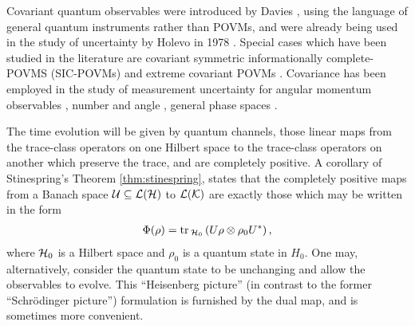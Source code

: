 Covariant quantum observables were introduced by Davies \cite{DAVIES1970318}, using the language of general quantum instruments rather than POVMs, and were already being used in the study of uncertainty by Holevo in 1978 \cite{HOLEVO1979385}. Special cases which have been studied in the literature are covariant symmetric informationally complete-POVMS (SIC-POVMs) \cites{doi:10.1063/1.1896384}{doi:10.1063/1.1737053} and extreme covariant POVMs \cites{doi:10.1063/1.2940328}{doi:10.1063/1.3668317}{doi:10.1063/1.1806262}{erkka-thesis}. Covariance has been employed in the study of measurement uncertainty for angular momentum observables \cite{DammeierSchwonnekWerner2015}, number and angle \cite{sharp-ur-num-angle}, general phase spaces \cite{Werner2016}.



The time evolution will be given by quantum channels, those linear maps from the trace-class operators on one Hilbert space to the trace-class operators on another which preserve the trace, and are completely positive. A corollary of Stinespring's Theorem \ref{thm:stinespring}, states that the completely positive maps from a Banach space $\ucal\subseteq\bops[\hcal]$ to $\bops[\mathcal{K}]$ are exactly those which may be written in the form
\begin{align}
  \Phi(\rho) = \tr{U \rho\otimes\rho_0 U^*}[\hcal_0],
\end{align}
where $\mathcal{H}_0$ is a Hilbert space and $\rho_0$ is a quantum state in $H_0$. One may, alternatively, consider the quantum state to be unchanging and allow the observables to evolve. This ``Heisenberg picture'' (in contrast to the former ``Schr\"odinger picture'') formulation is furnished by the dual map, and is sometimes more convenient.


